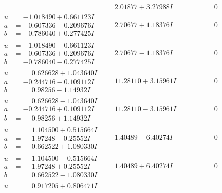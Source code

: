 \documentclass[1p]{elsarticle_modified}
\theoremstyle{definition}
\begin{document}
$$\begin{array}{c|c|c}
 & \phantom{-}2.01877 + 3.27988 I & \phantom{-0.000000 } 0 \\ \hline\begin{aligned}
u &= -1.018490 + 0.661123 I \\
a &= -0.607336 - 0.209676 I \\
b &= -0.786040 + 0.277425 I\end{aligned}
 & \phantom{-}2.70677 + 1.18376 I & \phantom{-0.000000 } 0 \\ \hline\begin{aligned}
u &= -1.018490 - 0.661123 I \\
a &= -0.607336 + 0.209676 I \\
b &= -0.786040 - 0.277425 I\end{aligned}
 & \phantom{-}2.70677 - 1.18376 I & \phantom{-0.000000 } 0 \\ \hline\begin{aligned}
u &= \phantom{-}0.626628 + 1.043640 I \\
a &= -0.244716 - 0.109112 I \\
b &= \phantom{-}0.98256 - 1.14932 I\end{aligned}
 & \phantom{-}11.28110 + 3.15961 I & \phantom{-0.000000 } 0 \\ \hline\begin{aligned}
u &= \phantom{-}0.626628 - 1.043640 I \\
a &= -0.244716 + 0.109112 I \\
b &= \phantom{-}0.98256 + 1.14932 I\end{aligned}
 & \phantom{-}11.28110 - 3.15961 I & \phantom{-0.000000 } 0 \\ \hline\begin{aligned}
u &= \phantom{-}1.104500 + 0.515664 I \\
a &= \phantom{-}1.97248 - 0.25552 I \\
b &= \phantom{-}0.662522 + 1.080330 I\end{aligned}
 & \phantom{-}1.40489 - 6.40274 I & \phantom{-0.000000 } 0 \\ \hline\begin{aligned}
u &= \phantom{-}1.104500 - 0.515664 I \\
a &= \phantom{-}1.97248 + 0.25552 I \\
b &= \phantom{-}0.662522 - 1.080330 I\end{aligned}
 & \phantom{-}1.40489 + 6.40274 I & \phantom{-0.000000 } 0 \\ \hline\begin{aligned}
u &= \phantom{-}0.917205 + 0.806471 I \\

\end{aligned}
\end{array}$$
\end{document}
